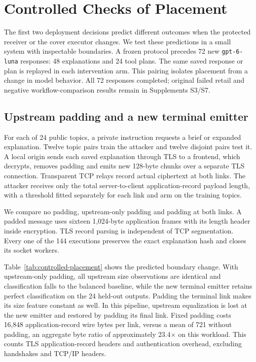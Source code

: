 \section{Controlled Checks of Placement}\label{sec:controlled-placement}
The first two deployment decisions predict different outcomes when the protected receiver or the cover executor changes. We test these predictions in a small system with inspectable boundaries. A frozen protocol precedes 72 new \texttt{gpt-6-luna} responses: 48 explanations and 24 tool plans. The same saved response or plan is replayed in each intervention arm. This pairing isolates placement from a change in model behavior. All 72 responses completed; original failed retail and negative workflow-comparison results remain in Supplements S3/S7.

\subsection{Upstream padding and a new terminal emitter}
For each of 24 public topics, a private instruction requests a brief or expanded explanation. Twelve topic pairs train the attacker and twelve disjoint pairs test it. A local origin sends each saved explanation through TLS to a frontend, which decrypts, removes padding and emits new 128-byte chunks over a separate TLS connection. Transparent TCP relays record actual ciphertext at both links. The attacker receives only the total server-to-client application-record payload length, with a threshold fitted separately for each link and arm on the training topics.

We compare no padding, upstream-only padding and padding at both links. A padded message uses sixteen 1,024-byte application frames with its length header inside encryption. TLS record parsing is independent of TCP segmentation. Every one of the 144 executions preserves the exact explanation hash and closes its socket workers.

Table~\ref{tab:controlled-placement} shows the predicted boundary change. With upstream-only padding, all upstream size observations are identical and classification falls to the balanced baseline, while the new terminal emitter retains perfect classification on the 24 held-out outputs. Padding the terminal link makes its size feature constant as well. In this pipeline, upstream equalization is lost at the new emitter and restored by padding its final link. Fixed padding costs 16,848 application-record wire bytes per link, versus a mean of 721 without padding, an aggregate byte ratio of approximately 23.4$\times$ on this workload. This counts TLS application-record headers and authentication overhead, excluding handshakes and TCP/IP headers.

